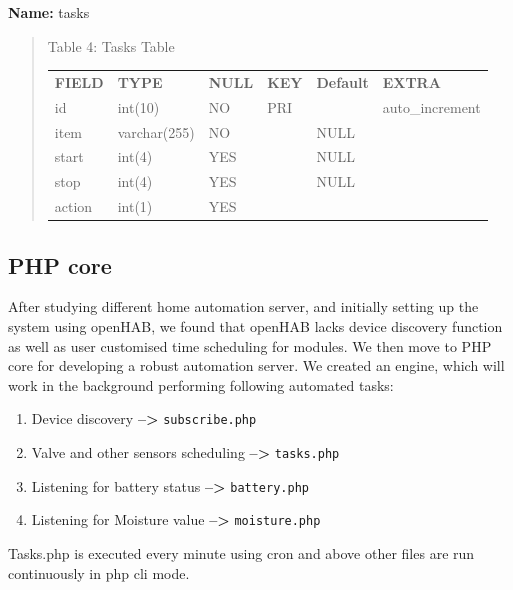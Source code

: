 \documentclass[16pt]{article}
\begin{document}
\textbf{Name:} tasks
\begin{quote}
\centering
\caption{Table 4: Tasks Table}
\label{my-label}
\begin{tabular}{llllll}
	{\bf FIELD} & {\bf TYPE}   & {\bf NULL} & {\bf KEY} & {\bf Default} & {\bf EXTRA}     \\
	id          & int(10)      & NO         & PRI       &           & auto\_increment \\
	item        & varchar(255) & NO         &           & NULL          &                 \\
	start       & int(4)       & YES        &           & NULL          &                 \\
	stop        & int(4)       & YES        &           & NULL          &                 \\
	action      & int(1)       & YES        &           &               &                
\end{tabular}
\end{quote}






\subsection{PHP core}
After studying different home automation server, and initially setting up the system using openHAB, we found that openHAB lacks device discovery function as well as user customised time scheduling for modules. We then move to PHP core for developing a robust automation server. We created an engine, which will work in the background performing
following automated tasks:

\begin{enumerate}

\item Device discovery \textbf{--\textgreater{}}
\texttt{subscribe.php}
\item Valve and other sensors scheduling
\textbf{--\textgreater{}} \texttt{tasks.php} 
\item Listening for battery status \textbf{--\textgreater{}} \texttt{battery.php} 
\item Listening for Moisture value \textbf{--\textgreater{}} \texttt{moisture.php}

\end{enumerate}


Tasks.php is executed every minute using cron and above other files are
run continuously in php cli mode.
\end{document}
